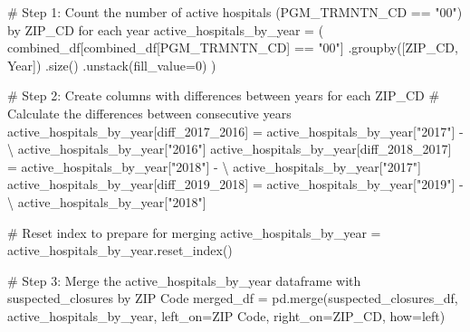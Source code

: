 \documentclass[
  letterpaper,
  DIV=11,
  numbers=noendperiod]{scrartcl}
\newenvironment{Shaded}{\begin{snugshade}}{\end{snugshade}}
\newcommand{\CommentTok}[1]{\textcolor[rgb]{0.37,0.37,0.37}{#1}}
\newcommand{\DecValTok}[1]{\textcolor[rgb]{0.68,0.00,0.00}{#1}}
\newcommand{\NormalTok}[1]{\textcolor[rgb]{0.00,0.23,0.31}{#1}}
\newcommand{\OperatorTok}[1]{\textcolor[rgb]{0.37,0.37,0.37}{#1}}
\newcommand{\StringTok}[1]{\textcolor[rgb]{0.13,0.47,0.30}{#1}}
\begin{document}
\begin{Shaded}
\begin{Highlighting}[]
\CommentTok{\# Step 1: Count the number of active hospitals (PGM\_TRMNTN\_CD == "00") by ZIP\_CD for each year}
\NormalTok{active\_hospitals\_by\_year }\OperatorTok{=}\NormalTok{ (}
\NormalTok{    combined\_df[combined\_df[}\StringTok{\textquotesingle{}PGM\_TRMNTN\_CD\textquotesingle{}}\NormalTok{] }\OperatorTok{==} \StringTok{"00"}\NormalTok{]}
\NormalTok{    .groupby([}\StringTok{\textquotesingle{}ZIP\_CD\textquotesingle{}}\NormalTok{, }\StringTok{\textquotesingle{}Year\textquotesingle{}}\NormalTok{])}
\NormalTok{    .size()}
\NormalTok{    .unstack(fill\_value}\OperatorTok{=}\DecValTok{0}\NormalTok{)}
\NormalTok{)}

\CommentTok{\# Step 2: Create columns with differences between years for each ZIP\_CD}
\CommentTok{\# Calculate the differences between consecutive years}
\NormalTok{active\_hospitals\_by\_year[}\StringTok{\textquotesingle{}diff\_2017\_2016\textquotesingle{}}\NormalTok{] }\OperatorTok{=}\NormalTok{ active\_hospitals\_by\_year[}\StringTok{"2017"}\NormalTok{] }\OperatorTok{{-}} \OperatorTok{\textbackslash{}}
\NormalTok{    active\_hospitals\_by\_year[}\StringTok{"2016"}\NormalTok{]}
\NormalTok{active\_hospitals\_by\_year[}\StringTok{\textquotesingle{}diff\_2018\_2017\textquotesingle{}}\NormalTok{] }\OperatorTok{=}\NormalTok{ active\_hospitals\_by\_year[}\StringTok{"2018"}\NormalTok{] }\OperatorTok{{-}} \OperatorTok{\textbackslash{}}
\NormalTok{    active\_hospitals\_by\_year[}\StringTok{"2017"}\NormalTok{]}
\NormalTok{active\_hospitals\_by\_year[}\StringTok{\textquotesingle{}diff\_2019\_2018\textquotesingle{}}\NormalTok{] }\OperatorTok{=}\NormalTok{ active\_hospitals\_by\_year[}\StringTok{"2019"}\NormalTok{] }\OperatorTok{{-}} \OperatorTok{\textbackslash{}}
\NormalTok{    active\_hospitals\_by\_year[}\StringTok{"2018"}\NormalTok{]}

\CommentTok{\# Reset index to prepare for merging}
\NormalTok{active\_hospitals\_by\_year }\OperatorTok{=}\NormalTok{ active\_hospitals\_by\_year.reset\_index()}

\CommentTok{\# Step 3: Merge the active\_hospitals\_by\_year dataframe with suspected\_closures by ZIP Code}
\NormalTok{merged\_df }\OperatorTok{=}\NormalTok{ pd.merge(suspected\_closures\_df, active\_hospitals\_by\_year,}
\NormalTok{                     left\_on}\OperatorTok{=}\StringTok{\textquotesingle{}ZIP Code\textquotesingle{}}\NormalTok{, right\_on}\OperatorTok{=}\StringTok{\textquotesingle{}ZIP\_CD\textquotesingle{}}\NormalTok{, how}\OperatorTok{=}\StringTok{\textquotesingle{}left\textquotesingle{}}\NormalTok{)}


\end{Highlighting}
\end{Shaded}
\end{document}
